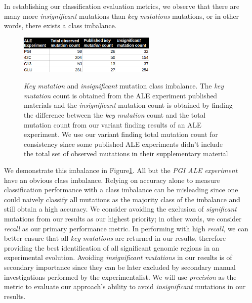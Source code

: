 \documentclass[12pt,final,masters,chapterheads]{ucsd}  %
\begin{document}
In establishing our classification evaluation metrics, we observe that there are many more \textit{insignificant} mutations than \textit{key mutations} mutations, or in other words, there exists a class imbalance.

\begin{figure}[H]
  \caption{\textit{Key mutation} and \textit{insignificant} mutation class imbalance. The \textit{key mutation} count is obtained from the ALE experiment published materials and the \textit{insignificant} mutation count is obtained by finding the difference between the \textit{key mutation} count and the total mutation count from our variant finding results of an ALE experiment. We use our variant finding total mutation count for consistency since some published ALE experiments didn't include the total set of observed mutations in their supplementary material}
  \centering
  \includegraphics[width=0.6\textwidth]{class_imbalance_table.png}
  \label{fig:class_imbalance_table}
\end{figure}

We demonstrate this imbalance in Figure\ref{fig:class_imbalance_table}. All but the \textit{PGI ALE experiment} have an obvious class imbalance. Relying on accuracy alone to measure classification performance with a class imbalance can be misleading since one could naively classify all mutations as the majority class of the imbalance and still obtain a high accuracy. We consider avoiding the exclusion of \textit{significant} mutations from our results as our highest priority; in other words, we consider \textit{recall} as our primary performance metric. In performing with high \textit{recall}, we can better ensure that all \textit{key mutations} are returned in our results, therefore providing the best identification of all significant genomic regions in an experimental evolution. Avoiding \textit{insignificant mutations} in our results is of secondary importance since they can be later excluded by secondary manual investigations performed by the experimentalist. We will use \textit{precision} as the metric to evaluate our approach's ability to avoid \textit{insignificant} mutations in our results.
\end{document}
